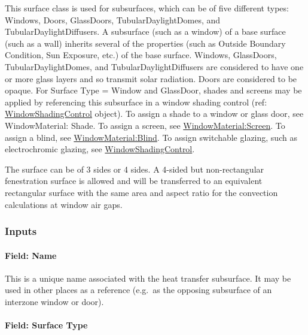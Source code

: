 This surface class is used for subsurfaces, which can be of five different types: Windows, Doors, GlassDoors, TubularDaylightDomes, and TubularDaylightDiffusers. A subsurface (such as a window) of a base surface (such as a wall) inherits several of the properties (such as Outside Boundary Condition, Sun Exposure, etc.) of the base surface. Windows, GlassDoors, TubularDaylightDomes, and TubularDaylightDiffusers are considered to have one or more glass layers and so transmit solar radiation. Doors are considered to be opaque. For Surface Type = Window and GlassDoor, shades and screens may be applied by referencing this subsurface in a window shading control (ref: \hyperref[windowpropertyshadingcontrol]{WindowShadingControl} object). To assign a shade to a window or glass door, see WindowMaterial: Shade. To assign a screen, see \hyperref[windowmaterialscreen]{WindowMaterial:Screen}. To assign a blind, see \hyperref[windowmaterialblind]{WindowMaterial:Blind}. To assign switchable glazing, such as electrochromic glazing, see \hyperref[windowpropertyshadingcontrol]{WindowShadingControl}.

The surface can be of 3 sides or 4 sides. A 4-sided but non-rectangular fenestration surface is allowed and will be transferred to an equivalent rectangular surface with the same area and aspect ratio for the convection calculations at window air gaps.

\subsubsection{Inputs}\label{inputs-24-004}

\paragraph{Field: Name}\label{field-name-20-004}

This is a unique name associated with the heat transfer subsurface. It may be used in other places as a reference (e.g.~as the opposing subsurface of an interzone window or door).

\paragraph{Field: Surface Type}\label{field-surface-type-2016-06-16}

